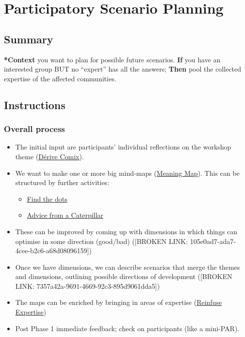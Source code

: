 \documentclass[11pt]{article}
\begin{document}
\section{Participatory Scenario Planning}
\label{95072d03-1359-4863-bad1-651191eb2f38}
\subsection{Summary}
\label{sec:org5a81d99}

\textbf{*Context} you want to plan for possible future scenarios. \textbf{If} you have
an interested group BUT no ``expert'' has all the answers; \textbf{Then} pool the
collected expertise of the affected communities.

\subsection{Instructions}
\label{sec:org118a0fd}

\subsubsection{Overall process}
\label{sec:org748c1ef}

\begin{itemize}
\item The initial input are participants' individual reflections on the workshop theme (\hyperref[615846a2-1795-40b4-8dfb-3e12923fccc0]{Dérive Comix}).
\item We want to make one or more big mind-maps (\hyperref[407beae8-ab2f-4340-9552-211d3b92ede6]{Meaning Map}). This can be structured by further activities:
\begin{itemize}
\item \hyperref[a853be79-85c1-4ffa-9750-459192c539e8]{Find the dots}
\item \hyperref[0ef4b185-513f-40c2-b884-6213601bbe09]{Advice from a Caterpillar}
\end{itemize}
\item These can be improved by coming up with dimensions in which things can optimise in some direction (good/bad) ([BROKEN LINK: 105e0ad7-ada7-4cee-b2c6-a68d08096159])
\item Once we have dimensions, we can describe scenarios that merge the themes and dimensions, outlining possible directions of development ([BROKEN LINK: 7357a42a-9691-4669-92c3-895d9061dda5])
\item The maps can be enriched by bringing in areas of expertise (\hyperref[bf8791b5-e50b-4666-bc01-286e279a5971]{Reinfuse Expertise})
\item Post Phase 1 immediate feedback; check on participants (like a mini-PAR).
\end{itemize}
\end{document}
